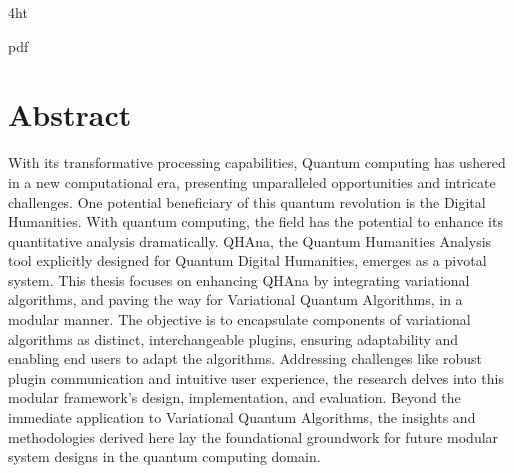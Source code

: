\documentclass[
  a4paper,  %
  twoside,  %
  bibliography=totoc,
  headsepline,
  cleardoublepage=empty,
  parskip=half,
  draft=false
]{scrbook}
\begin{document}
\iftex4ht
  \Configure{$}{\PicMath}{\EndPicMath}{}

  {pdf}
  {%
  }
\fi



\Titelblatt

\pagestyle{preamble}
\renewcommand*{\chapterpagestyle}{preamble}



\section*{Abstract}
With its transformative processing capabilities, Quantum computing has ushered in a new computational era, presenting unparalleled opportunities and intricate challenges.
One potential beneficiary of this quantum revolution is the Digital Humanities. With quantum computing, the field has the potential to enhance its quantitative analysis dramatically.
QHAna, the Quantum Humanities Analysis tool explicitly designed for Quantum Digital Humanities, emerges as a pivotal system.
This thesis focuses on enhancing QHAna by integrating variational algorithms, and paving the way for Variational Quantum Algorithms, in a modular manner.
The objective is to encapsulate components of variational algorithms as distinct, interchangeable plugins, ensuring adaptability and enabling end users to adapt the algorithms.
Addressing challenges like robust plugin communication and intuitive user experience, the research delves into this modular framework's design, implementation, and evaluation.
Beyond the immediate application to Variational Quantum Algorithms, the insights and methodologies derived here lay the foundational groundwork for future modular system designs in the quantum computing domain.
\end{document}
